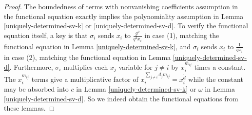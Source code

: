 \documentclass[11pt,letterpaper]{article}
\theoremstyle{definition}
\theoremstyle{remark}
\numberwithin{equation}{section}
\theoremstyle{dotless}
\renewcommand{\tilde}{\widetilde}
\begin{document}
\begin{proof}
The boundedness of terms with nonvanishing coefficients assumption in the functional equation exactly implies the polynomiality assumption in Lemma \ref{uniquely-determined-sv-k} or \ref{uniquely-determined-sv-d}. To verify the functional equation itself, a key is that $\sigma_i$ sends $x_i$ to $\frac{ g^2}{q^2x_i}$ in case (1), matching the functional equation in Lemma \ref{uniquely-determined-sv-k}, and $\sigma_i$ sends $x_i$ to $\frac{1}{qx_i}$ in case (2), matching the functional equation in Lemma \ref{uniquely-determined-sv-d}. Furthermore, $\sigma_i$ multiplies each $x_j$ variable for $j\neq i$ by $x_i^{m_{ij}}$ times a constant. The $x_i^{m_{ij}}$ terms give a multiplicative factor of $x_i^{ \sum_{j\neq i }  d_j m_{ij}} = x_i^{\tilde{d}}$ while the constant may be absorbed into $c$ in Lemma \ref{uniquely-determined-sv-k} or $\omega$ in Lemma \ref{uniquely-determined-sv-d}. So we indeed obtain the functional equations from these lemmas. \end{proof}




\end{document}
